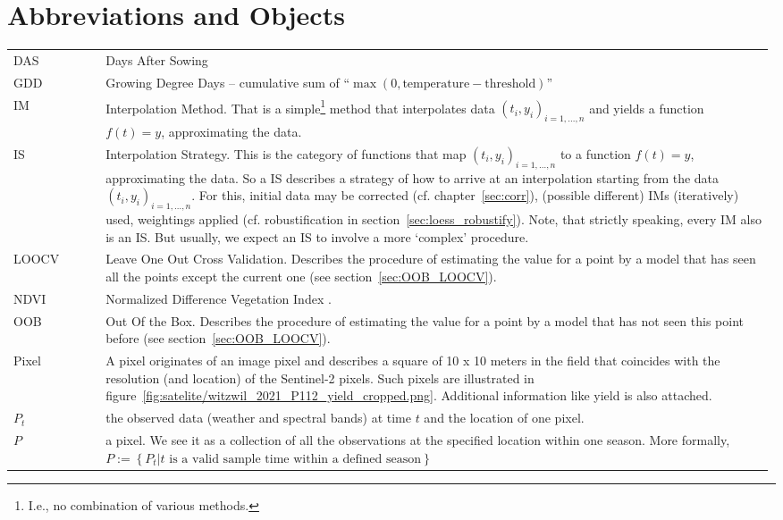 \section*{Abbreviations and Objects}\vspace{-0.3cm}
\begin{longtable}{p{0.12\linewidth} p{0.87\linewidth}}
	DAS       & Days After Sowing\\
	GDD       & Growing Degree Days -- cumulative sum of ``$\max(0, \text{temperature}-\text{threshold})$''\\
	IM       & Interpolation Method. That is a simple\footnote{I.e., no combination of various methods.} method that interpolates data $(t_i,y_i)_{i = 1,\dots ,n}$ and yields a function $f(t)=y$, approximating the data. \\
	IS       & Interpolation Strategy. This is the category of functions that map $(t_i,y_i)_{i=1,\dots,n}$ to a function $f(t)=y$, approximating the data. So a IS describes a strategy of how to arrive at an interpolation starting from the data $(t_i,y_i)_{i=1,\dots,n}$. For this, initial data may be corrected (cf. chapter~\ref{sec:corr}), (possible different) IMs (iteratively) used, weightings applied (cf. robustification in section~\ref{sec:loess_robustify}). Note, that strictly speaking, every IM also is an IS. But usually, we expect an IS to involve a more `complex' procedure. \\
	LOOCV        & Leave One Out Cross Validation. Describes the procedure of estimating the value for a point by a model that has seen all the points except the current one (see section~\ref{sec:OOB_LOOCV}).\\
	NDVI       & Normalized Difference Vegetation Index \citep{rouseMonitoringVernalAdvancement1974}.\\
	OOB        & Out Of the Box. Describes the procedure of  estimating the value for a point by a model that has not seen this point before (see section~\ref{sec:OOB_LOOCV}).\\
	Pixel       & A pixel originates of an image pixel and describes a square of 10 x 10 meters in the field that coincides with the resolution (and location) of the Sentinel-2 pixels. Such pixels are illustrated in figure~\ref{fig:satelite/witzwil_2021_P112_yield_cropped.png}. Additional information like yield is also attached.\\
	$P_t$       & the observed data (weather and spectral bands) at time $t$ and the location of one pixel. \\
	$P$       & a pixel. We see it as a collection of all the observations at the specified location within one season. More formally, $P := \left\{P_t | t\text{ is a valid sample time within a defined season}\right\}$\\

\end{longtable}
